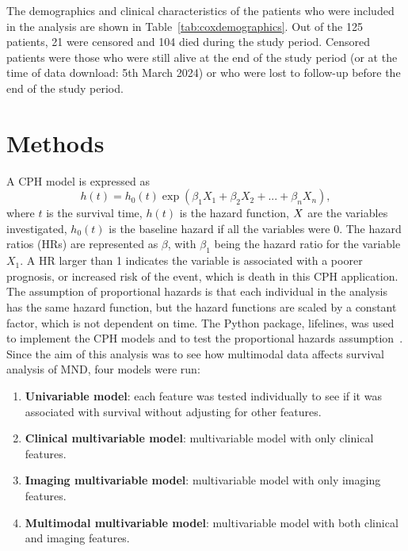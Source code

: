 The demographics and clinical characteristics of the patients who were included in the analysis are shown in Table~\ref{tab:coxdemographics}.
Out of the 125 patients, 21 were censored and 104 died during the study period.
Censored patients were those who were still alive at the end of the study period (or at the time of data download: 5th March 2024) or who were lost to follow-up before the end of the study period.

\section{Methods}

A CPH model is expressed as
\begin{equation}\label{eq:coxhazard}
    h(t) = h_0(t) \exp{(\beta_1 X_1 + \beta_2 X_2 + ... + \beta_n X_n)},
\end{equation}
where $t$ is the survival time, $h(t)$ is the hazard function, $\boldmath{X}$ are the variables investigated, $h_0(t)$ is the baseline hazard if all the variables were 0.
The hazard ratios (HRs) are represented as $\beta$, with $\beta_1$ being the hazard ratio for the variable $X_1$.
A HR larger than 1 indicates the variable is associated with a poorer prognosis, or increased risk of the event, which is death in this CPH application.
The assumption of proportional hazards is that each individual in the analysis has the same hazard function, but the hazard functions are scaled by a constant factor, which is not dependent on time.
The Python package, lifelines, was used to implement the CPH models and to test the proportional hazards assumption~\cite{davidson-pilonLifelinesSurvivalAnalysis2019}.
Since the aim of this analysis was to see how multimodal data affects survival analysis of MND, four models were run:
\begin{enumerate}
\setlength\itemsep{-0.5em}
    \item \textbf{Univariable model}: each feature was tested individually to see if it was associated with survival without adjusting for other features.
    \item \textbf{Clinical multivariable model}: multivariable model with only clinical features.
    \item \textbf{Imaging multivariable model}: multivariable model with only imaging features.
    \item \textbf{Multimodal multivariable model}: multivariable model with both clinical and imaging features.
\end{enumerate}

